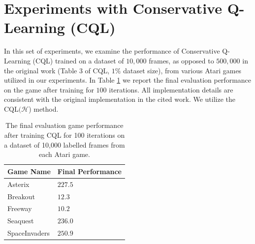 \documentclass{article} %
\begin{document}
\section{Experiments with Conservative Q-Learning (CQL)}
In this set of experiments, we examine the performance of Conservative Q-Learning (CQL) \citep{10.5555/3495724.3495824} trained on a dataset of $10,000$ frames, as opposed to $500,000$ in the original work (Table 3 of CQL, $1\%$ dataset size), from various Atari games utilized in our experiments.  In Table \ref{cql} we report the final evaluation performance on the game after training for $100$ iterations.  All implementation details are consistent with the original implementation in the cited work.  We utilize the CQL$(\mathcal{H}$) method.
\begin{table}[H]
\caption{The final evaluation game performance after training CQL for 100 iterations on a dataset of 10,000 labelled frames from each Atari game.}
\label{cql}
\begin{center}
\begin{tabular}{ll}
\multicolumn{1}{c}{\bf Game Name} & 
\multicolumn{1}{c}{\bf Final Performance} 
\\ \hline
{Asterix} & $227.5$
\\
{Breakout} & $12.3$
\\
{Freeway} & $10.2$ 
\\
{Seaquest} & $236.0$
\\
{SpaceInvaders} & $250.9$ 
\end{tabular}
\end{center}
\end{table}
\end{document}
